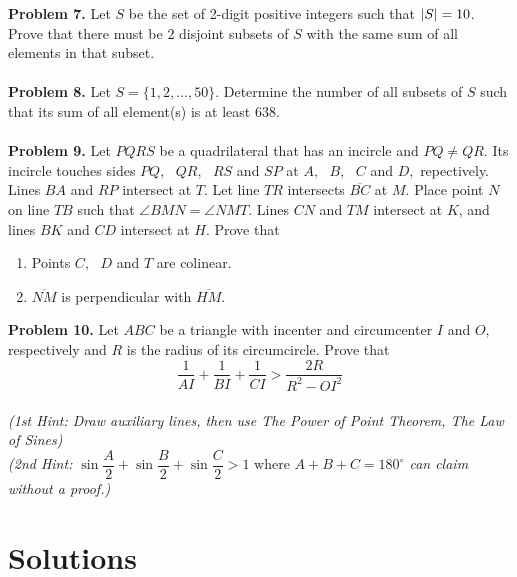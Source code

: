 \documentclass[12pt]{article}
\begin{document}
  \textbf{Problem 7.  } Let $S$ be the set of 2-digit positive integers such that $\left\lvert S \right\rvert = 10$. Prove that there must be $2$ disjoint subsets of $S$ with the same sum of all elements in that subset.\\ \\
 \textbf{Problem 8.  } Let $S=\{1,2,\dots,50\}$. Determine the number of all subsets of $S$ such that its sum of all element(s) is at least 638. \\ \\
 \textbf{Problem 9.  } Let $PQRS$ be a quadrilateral that has an incircle and $PQ\neq QR$. Its incircle touches sides $PQ,\text{ } QR,\text{ }  RS$ and $SP$ at $A,\text{ } B,\text{ }  C$ and $D,$ repectively. Lines $BA$ and $RP$ intersect at $T$. Let line $TR$ intersects $\overline{BC}$ at $M$. Place point $N$ on line $TB$ such that $\angle{BMN} = \angle{NMT}$. Lines  $CN$ and  $TM$ intersect at $K$, and lines $BK$ and $CD$ intersect at $H$. Prove that 
\begin{enumerate}[label=(\alph*)]
\item Points $C,\text{ } D$ and $T$ are colinear.
\item $\overline{NM}$ is perpendicular with $\overline{HM}$.
\end{enumerate} 
 \textbf{Problem 10.  } Let $ABC$ be  a triangle with incenter and circumcenter $I$ and $O$, respectively and $R$ is the radius of its circumcircle. Prove that $$\dfrac{1}{AI} + \dfrac{1}{BI} + \dfrac{1}{CI} > \dfrac{2R}{R^2-OI^2}$$\\
\textit {(1st Hint: Draw auxiliary lines, then use The Power of Point Theorem, The Law of Sines)}\\ 
\textit {(2nd Hint: $\sin{\dfrac{A}{2}}+\sin{\dfrac{B}{2}}+\sin{\dfrac{C}{2}} > 1 \text{ where } A+B+C = 180^{\circ}$ can claim without a proof.)}

\newpage
\section{Solutions}
\end{document}
